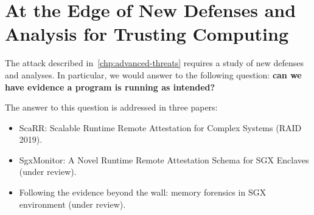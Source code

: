 \chapter{At the Edge of New Defenses and Analysis for Trusting Computing} %
\label{chp:runtime-protection} 

The attack described in~\ref{chp:advanced-threats} requires a study of new
defenses and analyses. In particular, we would answer to the following 
question: \textbf{can we have evidence a program is running as intended?}

The answer to this question is addressed in three papers:
\begin{itemize}
	\item ScaRR: Scalable Runtime Remote Attestation for Complex Systems (RAID 
	2019).
	\item SgxMonitor: A Novel Runtime Remote Attestation Schema for SGX 
	Enclaves (under review).
	\item Following the evidence beyond the wall: memory forensics in SGX
	environment (under review).
\end{itemize}